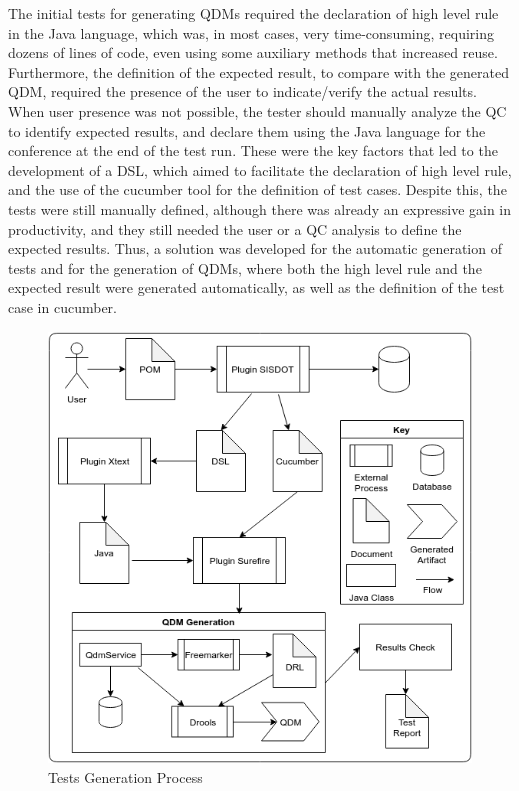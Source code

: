 The initial tests for generating QDMs required the declaration of high level rule in the Java language, which was, in most cases, very time-consuming, requiring dozens of lines of code, even using some auxiliary methods that increased reuse. Furthermore, the definition of the expected result, to compare with the generated QDM, required the presence of the user to indicate/verify the actual results. When user presence was not possible, the tester should manually analyze the QC to identify expected results, and declare them using the Java language for the conference at the end of the test run. These were the key factors that led to the development of a DSL, which aimed to facilitate the declaration of high level rule, and the use of the cucumber tool for the definition of test cases. Despite this, the tests were still manually defined, although there was already an expressive gain in productivity, and they still needed the user or a QC analysis to define the expected results. Thus, a solution was developed for the automatic generation of tests and for the generation of QDMs, where both the high level rule and the expected result were generated automatically, as well as the definition of the test case in cucumber.

\begin{figure}[!ht] %
	\includegraphics[scale=0.40]{img/processo.png}
	\caption{Tests Generation Process} 
	\label{fig:process}
\end{figure}
